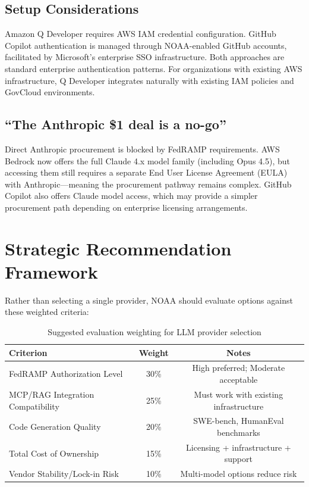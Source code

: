 \documentclass[11pt]{article}
\begin{document}
\subsection*{Setup Considerations}
Amazon Q Developer requires AWS IAM credential configuration. GitHub Copilot authentication is managed through NOAA-enabled GitHub accounts, facilitated by Microsoft's enterprise SSO infrastructure. Both approaches are standard enterprise authentication patterns. For organizations with existing AWS infrastructure, Q Developer integrates naturally with existing IAM policies and GovCloud environments.

\subsection*{``The Anthropic \$1 deal is a no-go''}
Direct Anthropic procurement is blocked by FedRAMP requirements. AWS Bedrock now offers the full Claude 4.x model family (including Opus 4.5), but accessing them still requires a separate End User License Agreement (EULA) with Anthropic---meaning the procurement pathway remains complex. GitHub Copilot also offers Claude model access, which may provide a simpler procurement path depending on enterprise licensing arrangements.

\section*{Strategic Recommendation Framework}

Rather than selecting a single provider, NOAA should evaluate options against these weighted criteria:

\begin{table}[h!]
\centering
\begin{tabular}{@{}lcc@{}}
\toprule
\textbf{Criterion} & \textbf{Weight} & \textbf{Notes} \\
\midrule
FedRAMP Authorization Level & 30\% & High preferred; Moderate acceptable \\
MCP/RAG Integration Compatibility & 25\% & Must work with existing infrastructure \\
Code Generation Quality & 20\% & SWE-bench, HumanEval benchmarks \\
Total Cost of Ownership & 15\% & Licensing + infrastructure + support \\
Vendor Stability/Lock-in Risk & 10\% & Multi-model options reduce risk \\
\bottomrule
\end{tabular}
\caption{Suggested evaluation weighting for LLM provider selection}
\end{table}
\end{document}

